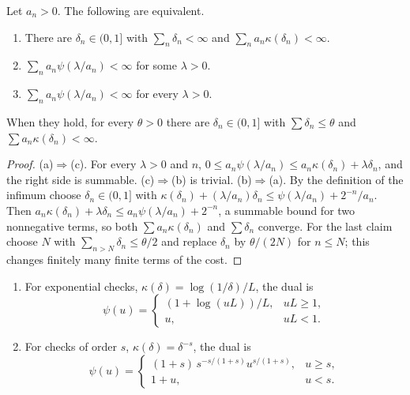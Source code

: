 \begin{theorem}\label{thm:dual}
Let $a_{n}>0$. The following are equivalent.
\begin{enumerate}[label=\textup{(\alph*)},leftmargin=2.2em,itemsep=1pt]
\item There are $\delta_{n}\in(0,1]$ with $\sum_{n}\delta_{n}<\infty$ and $\sum_{n}a_{n}\kappa(\delta_{n})<\infty$.
\item $\sum_{n}a_{n}\psi(\lambda/a_{n})<\infty$ for some $\lambda>0$.
\item $\sum_{n}a_{n}\psi(\lambda/a_{n})<\infty$ for every $\lambda>0$.
\end{enumerate}
When they hold, for every $\theta>0$ there are $\delta_{n}\in(0,1]$ with $\sum\delta_{n}\le\theta$ and $\sum a_{n}\kappa(\delta_{n})<\infty$.
\end{theorem}

\begin{proof}
(a)$\Rightarrow$(c). For every $\lambda>0$ and $n$, $0\le a_{n}\psi(\lambda/a_{n})\le a_{n}\kappa(\delta_{n})+\lambda\delta_{n}$, and the right side is summable.
(c)$\Rightarrow$(b) is trivial.
(b)$\Rightarrow$(a). By the definition of the infimum choose $\delta_{n}\in(0,1]$ with $\kappa(\delta_{n})+(\lambda/a_{n})\delta_{n}\le\psi(\lambda/a_{n})+2^{-n}/a_{n}$. Then $a_{n}\kappa(\delta_{n})+\lambda\delta_{n}\le a_{n}\psi(\lambda/a_{n})+2^{-n}$, a summable bound for two nonnegative terms, so both $\sum a_{n}\kappa(\delta_{n})$ and $\sum\delta_{n}$ converge.
For the last claim choose $N$ with $\sum_{n>N}\delta_{n}\le\theta/2$ and replace $\delta_{n}$ by $\theta/(2N)$ for $n\le N$; this changes finitely many finite terms of the cost.
\end{proof}

\begin{proposition}\label{prop:dualcosts}
\begin{enumerate}[label=\textup{(\roman*)},leftmargin=2.2em,itemsep=1pt]
\item For exponential checks, $\kappa(\delta)=\log(1/\delta)/L$, the dual is
\[
\psi(u)=\begin{cases}(1+\log(uL))/L,&uL\ge1,\\ u,&uL<1.\end{cases}
\]
\item For checks of order $s$, $\kappa(\delta)=\delta^{-s}$, the dual is
\[
\psi(u)=\begin{cases}(1+s)\,s^{-s/(1+s)}u^{s/(1+s)},&u\ge s,\\ 1+u,&u<s.\end{cases}
\]
\end{enumerate}
\end{proposition}

